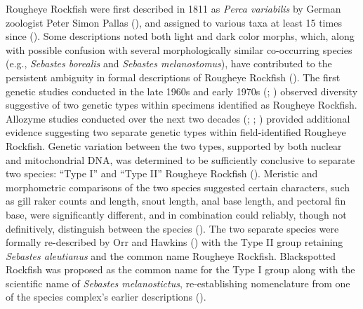 \documentclass[
]{scrartcl}
\begin{document}
Rougheye Rockfish were first described in 1811 as \emph{Perca
variabilis} by German zoologist Peter Simon Pallas
(), and
assigned to various taxa at least 15 times since
(). Some
descriptions noted both light and dark color morphs, which, along with
possible confusion with several morphologically similar co-occurring
species (e.g., \emph{Sebastes borealis} and \emph{Sebastes
melanostomus}), have contributed to the persistent ambiguity in formal
descriptions of Rougheye Rockfish (). The first genetic studies conducted in the late
1960s and early 1970s (; ) observed diversity suggestive of two genetic types within
specimens identified as Rougheye Rockfish. Allozyme studies conducted
over the next two decades (; ;
) provided
additional evidence suggesting two separate genetic types within
field-identified Rougheye Rockfish. Genetic variation between the two
types, supported by both nuclear and mitochondrial DNA, was determined
to be sufficiently conclusive to separate two species: ``Type I'' and
``Type II'' Rougheye Rockfish (). Meristic and morphometric comparisons of the two species
suggested certain characters, such as gill raker counts and length,
snout length, anal base length, and pectoral fin base, were
significantly different, and in combination could reliably, though not
definitively, distinguish between the species
(). The
two separate species were formally re-described by Orr and Hawkins
() with the Type II group retaining
\emph{Sebastes aleutianus} and the common name Rougheye Rockfish.
Blackspotted Rockfish was proposed as the common name for the Type I
group along with the scientific name of \emph{Sebastes melanostictus},
re-establishing nomenclature from one of the species complex's earlier
descriptions ().
\end{document}

